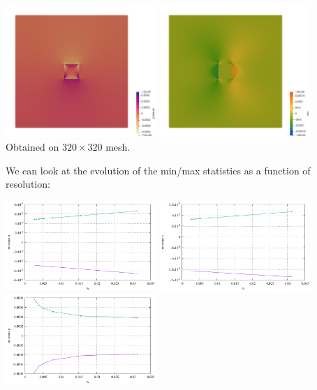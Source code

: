 \begin{center}
\includegraphics[width=5.7cm]{python_codes/fieldstone_158/results/exp5/press}
\includegraphics[width=5.7cm]{python_codes/fieldstone_158/results/exp5/exy}\\
{\captionfont Obtained on $320 \times 320$ mesh.}
\end{center}

We can look at the evolution of the min/max statistics as a function of resolution:

\begin{center}
\includegraphics[width=5.7cm]{python_codes/fieldstone_158/results/exp5/stats_u}
\includegraphics[width=5.7cm]{python_codes/fieldstone_158/results/exp5/stats_v}
\includegraphics[width=5.7cm]{python_codes/fieldstone_158/results/exp5/stats_p}\\
\end{center}

